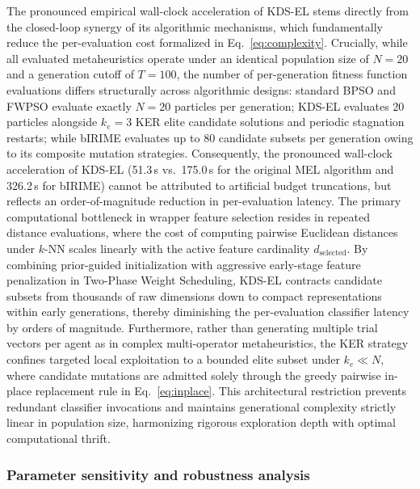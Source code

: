 The pronounced empirical wall-clock acceleration of KDS-EL stems directly from the closed-loop synergy of its algorithmic mechanisms, which fundamentally reduce the per-evaluation cost formalized in Eq.~\eqref{eq:complexity}. Crucially, while all evaluated metaheuristics operate under an identical population size of $N = 20$ and a generation cutoff of $T = 100$, the number of per-generation fitness function evaluations differs structurally across algorithmic designs: standard BPSO and FWPSO evaluate exactly $N = 20$ particles per generation; KDS-EL evaluates 20 particles alongside $k_e = 3$ KER elite candidate solutions and periodic stagnation restarts; while bIRIME evaluates up to 80 candidate subsets per generation owing to its composite mutation strategies. Consequently, the pronounced wall-clock acceleration of KDS-EL (51.3\,s vs.\ 175.0\,s for the original MEL algorithm and 326.2\,s for bIRIME) cannot be attributed to artificial budget truncations, but reflects an order-of-magnitude reduction in per-evaluation latency. The primary computational bottleneck in wrapper feature selection resides in repeated distance evaluations, where the cost of computing pairwise Euclidean distances under $k$-NN scales linearly with the active feature cardinality $d_{\mathrm{selected}}$. By combining prior-guided initialization with aggressive early-stage feature penalization in Two-Phase Weight Scheduling, KDS-EL contracts candidate subsets from thousands of raw dimensions down to compact representations within early generations, thereby diminishing the per-evaluation classifier latency by orders of magnitude. Furthermore, rather than generating multiple trial vectors per agent as in complex multi-operator metaheuristics, the KER strategy confines targeted local exploitation to a bounded elite subset under $k_e \ll N$, where candidate mutations are admitted solely through the greedy pairwise in-place replacement rule in Eq.~\eqref{eq:inplace}. This architectural restriction prevents redundant classifier invocations and maintains generational complexity strictly linear in population size, harmonizing rigorous exploration depth with optimal computational thrift.

\subsubsection{Parameter sensitivity and robustness analysis}\label{sec:parametric}

